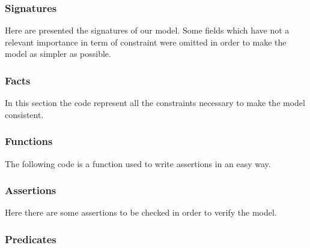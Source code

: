 \documentclass[a4paper]{article}
\begin{document}
\subsubsection{Signatures}

Here are presented the signatures of our model. Some fields which have not a relevant importance in term of constraint were omitted in order to make the model as simpler as possible.

\nopagebreak
\begin{minipage}[c]{\codeWidth}

\end{minipage}

\subsubsection{Facts}

In this section the code represent all the constraints necessary to make the model consistent.

\nopagebreak
\begin{minipage}[c]{\codeWidth}

\end{minipage}


\subsubsection{Functions}

The following code is a function used to write assertions in an easy way.

\nopagebreak
\begin{minipage}[c]{\codeWidth}

\end{minipage}

\subsubsection{Assertions}

Here there are some assertions to be checked in order to verify the model.

\nopagebreak
\begin{minipage}[c]{\codeWidth}

\end{minipage}

\subsubsection{Predicates}
\end{document}
